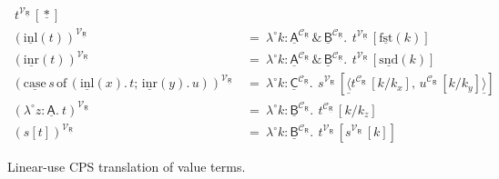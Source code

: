 \documentclass{LMCS}
\newcommand{\comptype}[1]{\underline{#1}}
\newcommand{\CA}{\comptype{\mathsf{A}}}
\newcommand{\CB}{\comptype{\mathsf{B}}}
\newcommand{\CC}{\comptype{\mathsf{C}}}
\newcommand{\CR}{\comptype{\mathsf{R}}}
\newcommand{\Cprod}{\,\&\,}
\newcommand{\In}[2]{#1 \colon  \! #2}
\newcommand{\compop}[1]{\underline{#1}}
\newcommand{\Cstar}{\compop{*}}
\newcommand{\Cpair}[2]{\compop{\langle} #1 , #2 \compop{\rangle}}
\newcommand{\Cfst}[1]{\compop{\mathrm{fst}}(#1)}
\newcommand{\Csnd}[1]{\compop{\mathrm{snd}}(#1)}
\newcommand{\llambda}{\lambda^{\!\circ\!}}
\newcommand{\llam}[3]{\llambda \In{#1}{#2}.\: #3}
\newcommand{\lappl}[2]{#1[#2]}
\newcommand{\Cinl}[1]{\compop{\mathrm{inl}}(#1)}
\newcommand{\Cinr}[1]{\compop{\mathrm{inr}}(#1)}
\newcommand{\Ccase}[5]{\compop{\mathrm{case}} \, #1 \,\mathrm{of}\,( \Cinl{#2}. \, #3 ; \, \Cinr{#4}. \, #5)}
\newcommand{\CpsVT}[1]{#1^{\mathcal{V}_{\CR}}}
\newcommand{\CpsCT}[1]{#1^{\mathcal{C}_{\CR}}}
\begin{document}
\begin{figure}[t]
\begin{align*}
   {\,\lappl{\CpsVT{t}\,}{\Cstar}}
\\ 
\CpsVT{(\Cinl{t})}  & \: = \:  \llam{k}{\CpsCT{\CA} \Cprod \CpsCT{\CB}}
   {\,\lappl{\CpsVT{t}\,}{\Cfst{k}}}
\\
\CpsVT{(\Cinr{t})}  & \: = \:  \llam{k}{\CpsCT{\CA} \Cprod \CpsCT{\CB}}
   {\,\lappl{\CpsVT{t}\,}{\Csnd{k}}}
\\ 
\CpsVT{(\Ccase{s}{x}{t}{y}{u})}  & \: = \:   \llam{k}{\CpsCT{\CC}}
   {\,\lappl{\CpsVT{s}\,}{\Cpair{\CpsCT{t}\,[k/k_x]}{\,\CpsCT{u}\,[k/k_y]}}} 
\\
\CpsVT{(\llam{z}{\CA}{t})}  & \: = \:  \llam{k}{\CpsCT{\CB}}{\,\CpsCT{t}\,[k/k_z]}
\\ 
\CpsVT{(\lappl{s}{t})}  & \: = \:  \llam{k}{\CpsCT{\CB}}
   {\,\lappl{\CpsVT{t}\,}{\lappl{\CpsVT{s}\,}{k}}}
\end{align*}
\caption{Linear-use CPS translation of value terms.}
\label{fig:cps:valterms}
\end{figure}
\end{document}
